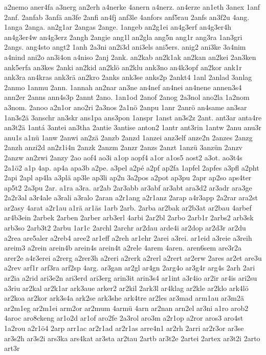 {a2nemo
aner4fa
a3nerg
an2erh
a4nerke
4anern
a4nerz.
an4erze
an1eth
3anex
1anf
2anf.
2anfab
3anfä
an3fe
2anfi
an4fj
anf3le
4anfors
anf5rau
2anfs
an3f2u
4ang.
1anga
2anga.
an2g1ar
2angas
2ange.
1angeb
an2g1ei
an4g3erf
an4g3er4h
an4g3er4w
an4g3erz
2angh
2angie
ang1l
an2gla
ang5n
ang1r
ang3ra
1an3gri
2angs.
ang4sto
angt2
1anh
2a3ni
an2i3d
ani3els
ani5ers.
anig2
ani3ke
3a4nim
a4nind
ani2o
an3i4on
a4niso
2anj
2ank.
an2kab
an2k1ak
an2kan
an2kei
2an3ken
ank5erfa
an3kes
2anki
an2kid
an2klö
an2klu
ank3no
an4k3opf
an2kor
ank1r
ank3ra
an4kras
ank3rä
an2kro
2anks
ank3se
anks2p
2ankt4
1anl
2anlad
3anlag
2anmo
1anmu
2ann.
1annah
an2nar
an3ne
an4nef
an4nei
an4nene
annen3s4
ann2er
2anns
ann4s3p
2annt
2ano.
1an1od
2anof
2anog
2a3nol
ano2la
1a2nom
a3nom.
2anoo
a2n1or
ano2ri
2a3nos
2a1nö
2anpu
1anr
2anrö
an4same
an3sar
1an3s2ä
3anschr
an3skr
ans1pa
ans3pon
1anspr
1anst
an3s2z
2ant.
ant3ar
anta4re
an3t2ä
1antá
3antei
an3tha
2antie
3antise
anton2
1antr
ant3rin
1antw
2anu
anu3r
anu1s
a1nü
1anw
2anwi
an2zä
2anzb
2anzd
1anzei
anz3elf
anze2n
2anzes
2anzg
2anzh
anzi2d
an2z1i4n
2anzk
2anzm
2anzr
2anzs
2anzt
1anzü
3anzün
2anzv
2anzw
an2zwi
2anzy
2ao
aof4
ao3i
a1op
aopf4
a1or
a1os5
aost2
a3ot.
ao3t4s
2a1ö2
a1p
4ap.
ap4a
apa3b
a2pe.
a3pel
a2pé
a2pf
ap2fa
1apfel
2apfes
a3pfl
a2pht
2api
2apl
ap4la
a3plä
ap3le
ap3li
ap2n
3a2pos
a2pot
ap3pu
2apr
ap2so
aps4ter
ap5t2
2a3pu
2ar.
a1ra
a3ra.
ar2ab
2ar3abb
ar3abf
ar3abt
ara3d2
ar3adr
ara3ge
2a2r3al
a3r4ale
a3rali
a3ralo
2aran
a2r1ang
a2r1anz
2arap
a4r3app
2a2rar
ara2st
ar2asy
4arat
a2r1au
a1rä
ar1äs
1arb
2arb.
2arba
ar2bak
ar2b3at
ar2bau
4arbef
ar4b3ein
2arbek
2arben
2arber
arb3erl
4arbi
2ar2bl
2arbo
2arb1r
2arbs2
arb3sk
arb3so
2arb3t2
2arbu
1ar1c
2archl
2archr
ar2dau
arde4i
ar2dop
ar2d3r
ar2du
a2rea
are5aler
a2reb4
aree2
ar1eff
a2reh
ar1ehr
2arei
a3rei.
ar1eid
a3reie
a3reih
areim3
a2rein
arein4b
arein4s
arein4t
a2rele
4arem
4aren.
aren6sem
are3r2a
arer2e
a4r3erei
a2rerg
a2rer3h
a2reri
a2rerk
a2rerl
a2rert
ar2erw
2ares
ar2et
are3u
a2rev
arf1r
arf3ra
arf2sp
4arg.
ar3gan
ar2gl
ar4gn
2arg4o
ar3g4r
arg4s
2arh
2ari
ar2ia
a2rid
ari3e2n
ari3erd
ari3erg
arin3it
arin3s4
ar1int
a3r4io
ar2ir
ar4is
ari2su
a3riu
ar2kal
ar2k1ar
ark3aue
arker2
ar2kil
2ark3l
ar4klag
ar2kle
ar2klo
ark4lö
ar2koa
ar2kor
ark3s4a
ark2se
ark3she
ark4tre
ar2les
ar3mad
arm1au
ar3m2ä
ar2m1eg
ar2m1ei
arm2or
ar2mum
4armü
4arn
ar2nan
arn2el
ar3ni
a1ro
arob2
4aroc
aro8ckeng
ar1o2d
ar1of
aro2fe
2a3rol
aro3m
a2r1op
a2ror
aros3
aro4st
1a2rou
a2r1ö4
2arp
arr1ac
ar2r1ad
ar2r1as
arre4n1
ar2rh
2arri
ar2r3or
ar3se
ar3s2h
ar3s2i
ars3ka
ars4kat
ar3sta
ar2tau
2artb
ar3t2e
2artei
2artex
ar3t2i
2arto
art3r
}
